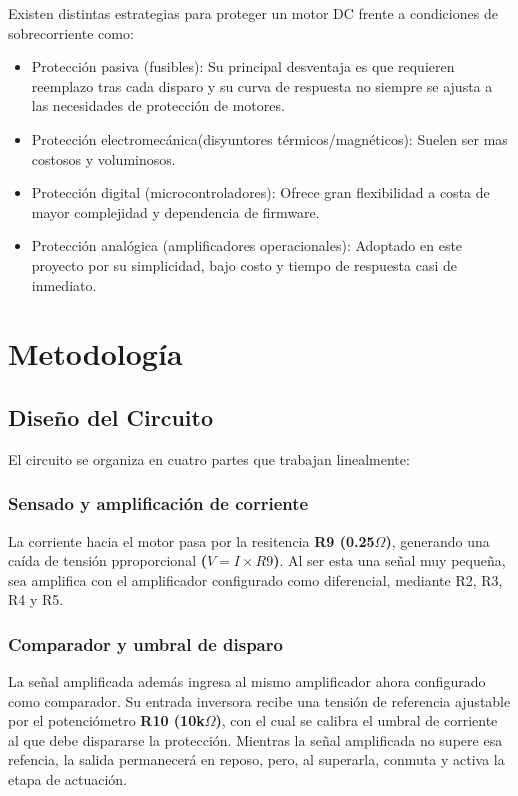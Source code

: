 \documentclass[conference]{IEEEtran}
\begin{document}
Existen distintas estrategias para proteger un motor DC frente a condiciones de sobrecorriente como:

\begin{itemize}
	\item Protección pasiva (fusibles): Su principal desventaja es que requieren reemplazo tras cada disparo y su curva de respuesta no siempre se ajusta a las necesidades de protección de motores.
	\item Protección electromecánica(disyuntores térmicos/magnéticos): Suelen ser mas costosos y voluminosos.
	\item Protección digital (microcontroladores): Ofrece gran flexibilidad a costa de mayor complejidad y dependencia de firmware.
	\item Protección analógica (amplificadores operacionales): Adoptado en este proyecto por su simplicidad, bajo costo y tiempo de respuesta casi de inmediato.
\end{itemize}

\section{Metodología}

\subsection{Diseño del Circuito}
El circuito se organiza en cuatro partes que trabajan linealmente:

\subsubsection{\textbf{Sensado y amplificación de corriente\\}}
La corriente hacia el motor pasa por la resitencia \textbf{R9 (0.25$\Omega$)}, generando una caída de tensión pproporcional \textbf{($V=I \times R9$)}. Al ser esta una señal muy pequeña, sea amplifica con el amplificador configurado como diferencial, mediante R2, R3, R4 y R5.

\subsubsection{\textbf{Comparador y umbral de disparo\\}}
La señal amplificada además ingresa al mismo amplificador ahora configurado como comparador. Su entrada inversora recibe una tensión de referencia ajustable por el potenciómetro \textbf{R10 (10k$\Omega$)}, con el cual se calibra el umbral de corriente al que debe dispararse la protección.
Mientras la señal amplificada no supere esa refencia, la salida permanecerá en reposo, pero, al superarla, conmuta y activa la etapa de actuación.
\end{document}
